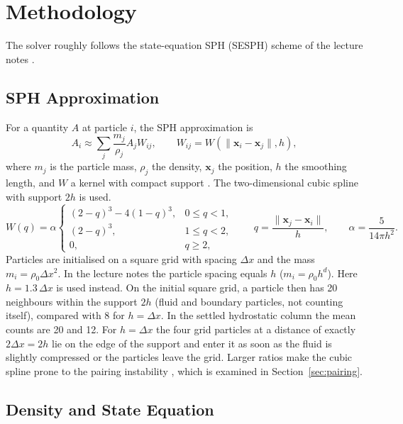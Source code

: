 \section{Methodology}

The solver roughly follows the state-equation SPH (SESPH) scheme of the lecture notes
\cite{teschner_notes}.

\subsection{SPH Approximation}

For a quantity $A$ at particle $i$, the SPH approximation is
\begin{equation}
    A_i \approx \sum_j \frac{m_j}{\rho_j} A_j W_{ij},
    \qquad W_{ij} = W(\lVert \boldsymbol{x}_i - \boldsymbol{x}_j \rVert, h),
\end{equation}
where $m_j$ is the particle mass, $\rho_j$ the density, $\boldsymbol{x}_j$ the
position, $h$ the smoothing length, and $W$ a kernel with compact support
\cite{teschner_notes}. The two-dimensional cubic spline with
support $2h$ is used.
\begin{equation}
    W(q) = \alpha
    \begin{cases}
        (2-q)^3 - 4(1-q)^3, & 0 \le q < 1,\\
        (2-q)^3,            & 1 \le q < 2,\\
        0,                  & q \ge 2,
    \end{cases}
    \qquad q = \frac{\lVert \boldsymbol{x}_j - \boldsymbol{x}_i \rVert}{h},
    \qquad \alpha = \frac{5}{14\pi h^2}.
\end{equation}
Particles are initialised on a square grid with spacing $\Delta x$ and
the mass $m_i = \rho_0 \Delta x^2$. In the lecture notes the particle spacing
equals $h$ ($m_i = \rho_0 h^d$). Here $h = 1.3\,\Delta x$ is used instead. On the
initial square grid, a particle then has 20 neighbours within the support
$2h$ (fluid and boundary particles, not counting itself), compared with 8 for
$h = \Delta x$. In the settled hydrostatic column the mean counts are 20 and 12.
For $h = \Delta x$ the four grid particles at a distance of exactly
$2\Delta x = 2h$ lie on the edge of the support and enter it as soon as the
fluid is slightly compressed or the particles leave the grid.
Larger ratios make the cubic spline prone to the pairing instability
\cite{dehnen2012}, which is examined in Section~\ref{sec:pairing}.

\subsection{Density and State Equation}

